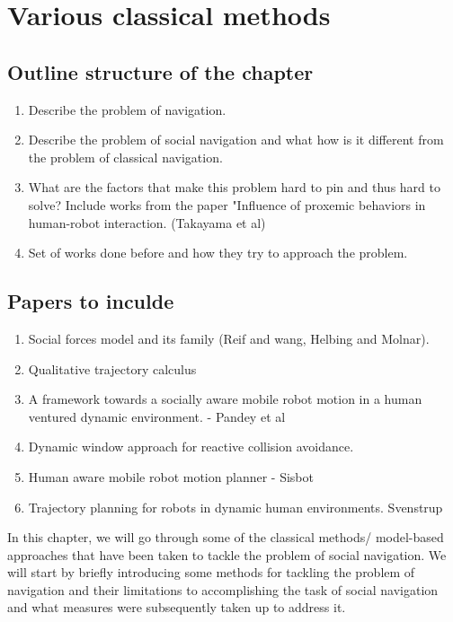 \section{Various classical methods}

\subsection*{Outline structure of the chapter}
\begin{enumerate}
    \item Describe the problem of navigation.
    \item Describe the problem of social navigation and what how is it different from the problem of classical navigation.

    \item What are the factors that make this problem hard to pin and thus hard to solve? Include works from the paper "Influence of proxemic behaviors in human-robot interaction. (Takayama et al)
    \item Set of works done before and how they try to approach the problem.
\end{enumerate}

\subsection*{Papers to inculde}
    \begin{enumerate}
        \item Social forces model and its family (Reif and wang, Helbing and Molnar).
        \item Qualitative trajectory calculus
        \item A framework towards a socially aware mobile robot motion in a human ventured dynamic environment. - Pandey et al
        \item Dynamic window approach for reactive collision avoidance.
        \item Human aware mobile robot motion planner - Sisbot
        \item Trajectory planning for robots in dynamic human environments. Svenstrup
    \end{enumerate}



In this chapter, we will go through some of the classical methods/ model-based approaches that have been taken to tackle the problem of social navigation. We will start by briefly introducing some methods for tackling the problem of navigation and their limitations to accomplishing the task of social navigation and what measures were subsequently taken up to address it.
